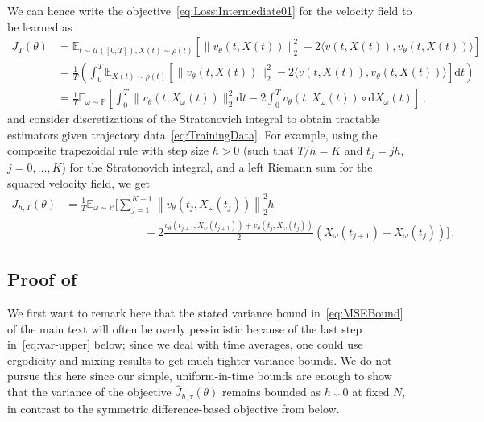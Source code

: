 \documentclass[oneside,11pt]{article}
\theoremstyle{remark}
\begin{document}
We can hence write the objective~\eqref{eq:Loss:Intermediate01} for the velocity field to be learned as
\begin{align*}
J_T(\theta) &= \mathbb{E}_{t \sim \mathcal{U}([0, T]), X(t) \sim \rho(t)} \left[\|v_{\theta}(t, X(t))\|^2_2 - 2 \langle v(t, X(t)),  v_{\theta}(t, X(t)) \rangle\right]\\
&= \frac{1}{T} \left( \int_0^T \mathbb{E}_{X(t) \sim \rho(t)} \left[ \lVert v_\theta(t, X(t)) \rVert_2^2 - 2 \langle v(t, X(t)), v_\theta(t, X(t))  \rangle  \right] \mathrm{d} t \right) \\
&= \frac{1}{T}\mathbb{E}_{\omega \sim \mathbb{P}} \left[ \int_0^T \lVert v_\theta(t, X_\omega(t)) \rVert_2^2 \mathrm{d}t - 2 \int_0^T v_\theta(t, X_\omega(t)) \circ \mathrm{d}X_\omega(t) \right]\,,
\end{align*}
and consider discretizations of the Stratonovich integral to obtain tractable estimators given trajectory data~\eqref{eq:TrainingData}. For example, using the composite trapezoidal rule with step size $h>0$ (such that $T/h = K$ and $t_j = j h$, $j = 0, \dots, K$) for the Stratonovich integral, and a left Riemann sum for the squared velocity field, we get
\begin{align*}
J_{h,T}(\theta) &= \frac{1}{T} \mathbb{E}_{\omega \sim \mathbb{P}} \bigg[ \sum_{j = 1}^{K-1} \left \lVert v_\theta \left(t_j, X_\omega(t_j) \right) \right \rVert_2^2 h \\
&\qquad \qquad \qquad \quad - 2 \frac{v_\theta\left( t_{j+1}, X_\omega(t_{j+1})\right) + v_\theta\left(t_j, X_\omega(t_j)\right)}{2} \left(X_\omega(t_{j+1}) - X_\omega(t_j)\right) \bigg] \,.
\end{align*}



\subsection{Proof of }
\label{appendix:ProofOfMSEBound}
We first want to remark here that the stated variance bound in~\eqref{eq:MSEBound} of the main text will often be overly pessimistic because of the last step in~\eqref{eq:var-upper} below; since we deal with time averages, one could use ergodicity and mixing results to get much tighter variance bounds. We do not pursue this here since our simple, uniform-in-time bounds are enough to show that the variance of the objective $\widehat{J}_{h,\tau}(\theta)$ remains bounded as $h \downarrow 0$ at fixed $N$, in contrast to the symmetric difference-based objective from  below.
\end{document}
